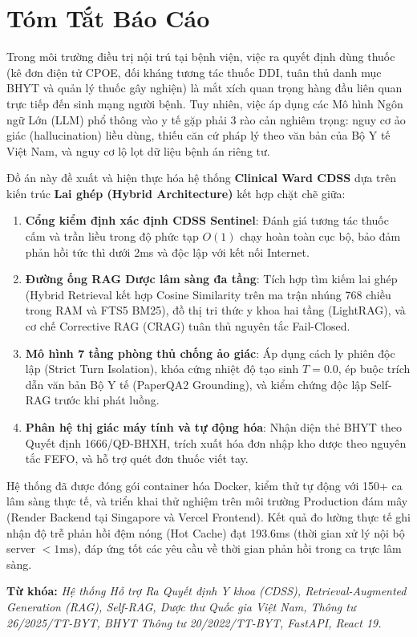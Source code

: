 \chapter*{Tóm Tắt Báo Cáo}

Trong môi trường điều trị nội trú tại bệnh viện, việc ra quyết định dùng thuốc (kê đơn điện tử CPOE, đối kháng tương tác thuốc DDI, tuân thủ danh mục BHYT và quản lý thuốc gây nghiện) là mắt xích quan trọng hàng đầu liên quan trực tiếp đến sinh mạng người bệnh. Tuy nhiên, việc áp dụng các Mô hình Ngôn ngữ Lớn (LLM) phổ thông vào y tế gặp phải 3 rào cản nghiêm trọng: nguy cơ ảo giác (hallucination) liều dùng, thiếu căn cứ pháp lý theo văn bản của Bộ Y tế Việt Nam, và nguy cơ lộ lọt dữ liệu bệnh án riêng tư.

Đồ án này đề xuất và hiện thực hóa hệ thống \textbf{Clinical Ward CDSS} dựa trên kiến trúc \textbf{Lai ghép (Hybrid Architecture)} kết hợp chặt chẽ giữa:
\begin{enumerate}[leftmargin=1.5em]
    \item \textbf{Cổng kiểm định xác định CDSS Sentinel}: Đánh giá tương tác thuốc cấm và trần liều trong độ phức tạp $O(1)$ chạy hoàn toàn cục bộ, bảo đảm phản hồi tức thì dưới 2ms và độc lập với kết nối Internet.
    \item \textbf{Đường ống RAG Dược lâm sàng đa tầng}: Tích hợp tìm kiếm lai ghép (Hybrid Retrieval kết hợp Cosine Similarity trên ma trận nhúng 768 chiều trong RAM và FTS5 BM25), đồ thị tri thức y khoa hai tầng (LightRAG), và cơ chế Corrective RAG (CRAG) tuân thủ nguyên tắc Fail-Closed.
    \item \textbf{Mô hình 7 tầng phòng thủ chống ảo giác}: Áp dụng cách ly phiên độc lập (Strict Turn Isolation), khóa cứng nhiệt độ tạo sinh $T = 0.0$, ép buộc trích dẫn văn bản Bộ Y tế (PaperQA2 Grounding), và kiểm chứng độc lập Self-RAG trước khi phát luồng.
    \item \textbf{Phân hệ thị giác máy tính và tự động hóa}: Nhận diện thẻ BHYT theo Quyết định 1666/QĐ-BHXH, trích xuất hóa đơn nhập kho dược theo nguyên tắc FEFO, và hỗ trợ quét đơn thuốc viết tay.
\end{enumerate}

Hệ thống đã được đóng gói container hóa Docker, kiểm thử tự động với 150+ ca lâm sàng thực tế, và triển khai thử nghiệm trên môi trường Production đám mây (Render Backend tại Singapore và Vercel Frontend). Kết quả đo lường thực tế ghi nhận độ trễ phản hồi đệm nóng (Hot Cache) đạt 193.6ms (thời gian xử lý nội bộ server $< 1\text{ms}$), đáp ứng tốt các yêu cầu về thời gian phản hồi trong ca trực lâm sàng.

\textbf{Từ khóa:} \textit{Hệ thống Hỗ trợ Ra Quyết định Y khoa (CDSS), Retrieval-Augmented Generation (RAG), Self-RAG, Dược thư Quốc gia Việt Nam, Thông tư 26/2025/TT-BYT, BHYT Thông tư 20/2022/TT-BYT, FastAPI, React 19.}
